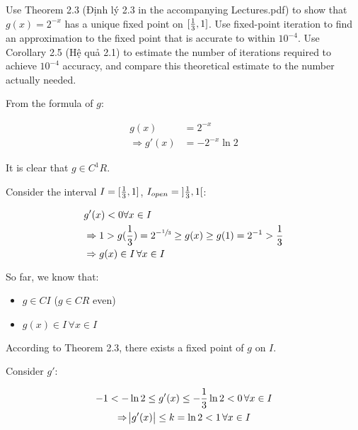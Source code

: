 \documentclass[../../../../Assignments]{subfiles}
\begin{document}
\begin{exercise}
    Use Theorem 2.3 (Định lý 2.3 in the accompanying Lectures.pdf) to show that
    \(g(x) = 2^{-x}\) has a unique fixed point on \(\interval{\frac{1}{3}}{1}\).
    Use fixed-point iteration to find an approximation to the fixed point that
    is accurate to within \(10^{-4}\). Use Corollary 2.5 (Hệ quả 2.1) to
    estimate the number of iterations required to achieve \(10^{-4}\) accuracy,
    and compare this theoretical estimate to the number actually needed.
\end{exercise}

\begin{solution}
    From the formula of \(g\):

    \begin{align*}
                     g(x) & = 2^{-x} \\
        \Rightarrow g'(x) & = - 2^{-x} \ln{2}
    \end{align*}

    It is clear that \(g \in C^1 R\).

    Consider the interval \(I = \interval{\frac{1}{3}}{1}\), \(I_{open} =
    \interval[open]{\frac{1}{3}}{1}\):

    \begin{align*}
        &g'(x) < 0 \forall x \in I \\
        &\Rightarrow 1 > g(\frac{1}{3}) = 2^{-\sfrac{1}{3}} \geq g(x) \geq g(1) = 2^{-1} > \frac{1}{3} \\
        &\Rightarrow g(x) \in I \, \forall x \in I
    \end{align*}

    So far, we know that:

    \begin{itemize}
        \item \(g \in C I\) (\(g \in C R\) even)
        \item \(g(x) \in I \, \forall x \in I\)
    \end{itemize}

    According to Theorem 2.3, there exists a fixed point of \(g\) on \(I\).

    Consider \(g'\):

    \begin{gather*}
        -1 < - \ln{2} \leq g'(x) \leq - \frac{1}{3} \ln{2} < 0 \, \forall x \in I \\
        \Rightarrow \abs{g'(x)} \leq k = \ln{2} < 1 \, \forall x \in I
    \end{gather*}


\end{solution}
\end{document}
